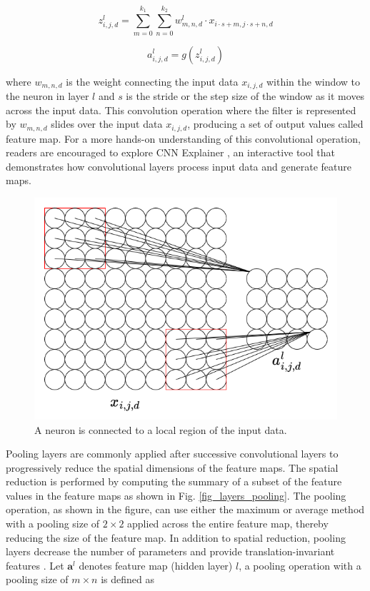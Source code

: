 \documentclass[preprint,12pt]{elsarticle}
\begin{document}
\begin{equation}
z_{i,j,d}^l=\sum_{m=0}^{k_1} \sum_{n=0}^{k_2} w_{m,n,d}^{l} \cdot x_{i\cdot s +m,j\cdot s+n,d}
\end{equation}

\begin{equation}
a_{i,j,d}^l=g(z_{i,j,d}^l)
\end{equation}

\noindent where $w_{m,n,d}$ is the weight connecting the input data $x_{i,j,d}$ within the window to the neuron in layer $l$ and $s$ is the stride or the step size of the window as it moves across the input data. This convolution operation where the filter is represented by $w_{m,n,d}$ slides over the input data $x_{i,j,d}$, producing a set of output values called feature map. For a more hands-on understanding of this convolutional operation, readers are encouraged to explore CNN Explainer \citep{noauthor_poloclubcnn-explainer_2025}, an interactive tool that demonstrates how convolutional layers process input data and generate feature maps.

\begin{figure}[h!]
\centering
\includegraphics[scale=0.4]{fig_layers_convolution.png}
\caption{A neuron is connected to a local region of the input data.}
\label{fig_layers_convolution}
\end{figure}

Pooling layers are commonly applied after successive convolutional layers to progressively reduce the spatial dimensions of the feature maps. The spatial reduction is performed by computing the summary of a subset of the feature values in the feature maps as shown in Fig. \ref{fig_layers_pooling}. The pooling operation, as shown in the figure, can use either the maximum or average method with a pooling size of $2 \times 2$ applied across the entire feature map, thereby reducing the size of the feature map. In addition to spatial reduction, pooling layers decrease the number of parameters and provide translation-invariant features \citep{lecun_deep_2015}. Let $\mathbf{a}^l$ denotes feature map (hidden layer) $l$, a pooling operation with a pooling size of $m \times n$ is defined as
\end{document}
